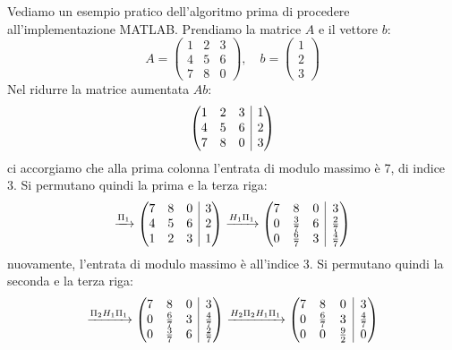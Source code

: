 \documentclass[a4paper,11pt]{article}
\begin{document}
\par\smallskip

Vediamo un esempio pratico dell'algoritmo prima di procedere all'implementazione MATLAB.
Prendiamo la matrice $A$ e il vettore $b$:
$$
A = \begin{pmatrix}
	1 & 2 & 3 \\ 
	4 & 5 & 6 \\ 
	7 & 8 & 0
\end{pmatrix}, \quad
b = \begin{pmatrix}
	1 \\ 2 \\ 3
\end{pmatrix}
$$
Nel ridurre la matrice aumentata $Ab$:
$$
\left(\begin{array}{@{}c c c | c@{}}
	1 & 2 & 3 & 1 \\ 
	4 & 5 & 6 & 2 \\ 
	7 & 8 & 0 & 3
\end{array}\right)
$$
ci accorgiamo che alla prima colonna l'entrata di modulo massimo è 7, di indice 3. Si permutano quindi la prima e la terza riga:
$$
\xrightarrow{\Pi_1}
\left(\begin{array}{@{}c c c | c@{}}
	7 & 8 & 0 & 3 \\
	4 & 5 & 6 & 2 \\ 
	1 & 2 & 3 & 1
\end{array}\right)
\xrightarrow{H_1 \Pi_1}
\left(\begin{array}{@{}c c c | c@{}}
		7 & 8 & 0 & 3 \\ 
		0 & \frac{3}{7} & 6 & \frac{2}{7} \\ 
		0 & \frac{6}{7} & 3 & \frac{4}{7}
\end{array}\right)
$$
nuovamente, l'entrata di modulo massimo è all'indice 3. Si permutano quindi la seconda e la terza riga:
$$
\xrightarrow{\Pi_2 H_1 \Pi_1}
\left(\begin{array}{@{}c c c | c@{}}
		7 & 8 & 0 & 3 \\ 
		0 & \frac{6}{7} & 3 & \frac{4}{7} \\
		0 & \frac{3}{7} & 6 & \frac{2}{7} 
\end{array}\right)
\xrightarrow{H_2 \Pi_2 H_1 \Pi_1}
\left(\begin{array}{@{}c c c | c@{}}
		7 & 8 & 0 & 3 \\ 
		0 & \frac{6}{7} & 3 & \frac{4}{7} \\
		0 & 0 & \frac{9}{2} & 0
\end{array}\right)
$$
\end{document}
